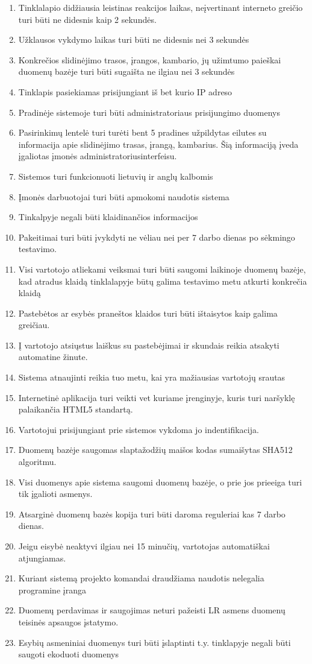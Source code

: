 \documentclass[oneside]{VUMIFPSkursinis}
\begin{document}
\begin{enumerate}
	\item Tinklalapio didžiausia leistinas reakcijos laikas, neįvertinant interneto greičio turi būti ne didesnis kaip 2 sekundės.
	\item Užklausos vykdymo laikas turi būti ne didesnis nei 3 sekundės
	\item Konkrečios slidinėjimo trasos, įrangos, kambario, jų užimtumo paieškai duomenų bazėje turi būti sugaišta ne ilgiau nei 3 sekundės
	\item Tinklapis pasiekiamas prisijungiant iš bet kurio IP adreso
	\item Pradinėje sistemoje turi būti administratoriaus prisijungimo duomenys
	\item Pasirinkimų lentelė turi turėti bent 5 pradines užpildytas eilutes su informacija apie slidinėjimo trasas, įrangą, kambarius. Šią informaciją įveda įgaliotas įmonės administratoriusinterfeisu.
	\item Sistemos turi funkcionuoti lietuvių ir anglų kalbomis
	\item Įmonės darbuotojai turi būti apmokomi naudotis sistema
	\item Tinkalpyje negali būti klaidinančios informacijos
	\item Pakeitimai turi būti įvykdyti ne vėliau nei per 7 darbo dienas po sėkmingo testavimo.
	\item Visi vartotojo atliekami veiksmai turi būti saugomi laikinoje duomenų bazėje, kad atradus klaidą tinklalapyje būtų galima testavimo metu atkurti konkrečia klaidą
	\item Pastebėtos ar esybės praneštos klaidos turi būti ištaisytos kaip galima greičiau.
	\item Į vartotojo atsiųstus laiškus su pastebėjimai ir skundais reikia atsakyti automatine žinute.
	\item Sistema atnaujinti reikia tuo metu, kai yra mažiausias vartotojų srautas
	\item Internetinė aplikacija turi veikti vet kuriame įrenginyje, kuris turi naršyklę palaikančia HTML5 standartą.
	\item Vartotojui prisijungiant prie sistemos vykdoma jo indentifikacija.
	\item Duomenų bazėje saugomas slaptažodžių maišos kodas sumaišytas SHA512 algoritmu.
	\item Visi duomenys apie sistema saugomi duomenų bazėje, o prie jos prieeiga turi tik įgalioti asmenys.
	\item Atsarginė duomenų bazės kopija turi būti daroma reguleriai kas 7 darbo dienas.
	\item Jeigu eisybė neaktyvi ilgiau nei 15 minučių, vartotojas automatiškai atjungiamas.
	\item Kuriant sistemą projekto komandai draudžiama naudotis nelegalia programine įranga
	\item Duomenų perdavimas ir saugojimas neturi pažeisti LR asmens duomenų teisinės apsaugos įstatymo.
	\item Esybių asmeniniai duomenys turi būti įslaptinti t.y. tinklapyje negali būti saugoti ekoduoti duomenys


\end{enumerate}
\end{document}
